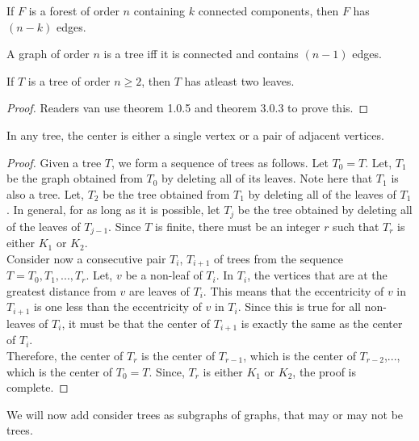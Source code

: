 \begin{thm}
    If $F$ is a forest of order $n$ containing $k$ connected components, then $F$ has $(n-k)$ edges.
\end{thm}

\begin{thm}
    A graph of order $n$ is a tree iff it is connected and contains $(n-1)$ edges.
\end{thm}

\begin{thm}
    If $T$ is a tree of order $n \ge 2$, then $T$ has atleast two leaves.
\end{thm}
\begin{proof}
    Readers van use theorem 1.0.5 and theorem 3.0.3 to prove this.
\end{proof}

\begin{thm}
    In any tree, the center is either a single vertex or a pair of adjacent vertices.
\end{thm}
\begin{proof}
Given a tree $T$, we form a sequence of trees as follows. Let $T_0 = T$. Let, $T_1$ be the graph obtained from $T_0$ by deleting all of its leaves. Note here that $T_1$ is also a tree. Let, $T_2$ be the tree obtained from $T_1$ by deleting all of the leaves of $T_1$. In general, for as long as it is possible, let $T_j$ be the tree obtained by deleting all of the leaves of $T_{j-1}$. Since $T$ is finite, there must be an integer $r$ such that $T_r$ is either $K_1$ or $K_2$.\\
Consider now a consecutive pair $T_i$, $T_{i+1}$ of trees from the sequence $T=T_0, T_1,..., T_r$. Let, $v$ be a non-leaf of $T_i$. In $T_i$, the vertices that are at the greatest distance from $v$ are leaves of $T_i$. This means that the eccentricity of $v$ in $T_{i+1}$ is one less than the eccentricity of $v$ in $T_i$. Since this is true for all non-leaves of $T_i$, it must be that the center of $T_{i+1}$ is exactly the same as the center of $T_i$.\\
Therefore, the center of $T_r$ is the center of $T_{r-1}$, which is the center of $T_{r-2}$,..., which is the center of $T_0=T$. Since, $T_r$ is either $K_1$ or $K_2$, the proof is complete.
\end{proof}

We will now add consider trees as subgraphs of graphs, that may or may not be trees.

